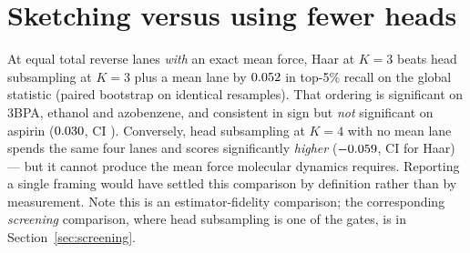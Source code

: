 \documentclass{article}
\begin{document}
\section{Sketching versus using fewer heads}
\label{app:headsub}
At equal total reverse lanes \emph{with} an exact mean force, Haar at $K{=}3$ beats head subsampling
at $K{=}3$ plus a mean lane by $0.052$ \fsDeltaVsHeadSubCI{} in top-5\% recall on the
global statistic (paired bootstrap on identical resamples). That ordering is significant on 3BPA,
ethanol and azobenzene, and consistent in sign but \emph{not} significant on aspirin
($0.030$, CI \fsDeltaVsHeadSubAspirinCI). Conversely, head subsampling at $K{=}4$
with no mean lane spends the same four lanes and scores significantly \emph{higher}
($-0.059$, CI \fsDeltaVsHeadSubNoMeanThreeBPACI{} for Haar) --- but it
cannot produce the mean force molecular dynamics requires. Reporting a single framing would have
settled this comparison by definition rather than by measurement. Note this is an estimator-fidelity
comparison; the corresponding \emph{screening} comparison, where head subsampling is one of the
gates, is in Section~\ref{sec:screening}.


\end{document}
